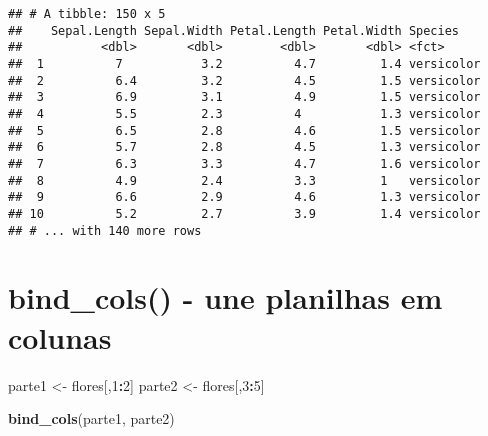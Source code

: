 \documentclass[]{book}
\newenvironment{Shaded}{\begin{snugshade}}{\end{snugshade}}
\newcommand{\DataTypeTok}[1]{\textcolor[rgb]{0.13,0.29,0.53}{#1}}
\newcommand{\DecValTok}[1]{\textcolor[rgb]{0.00,0.00,0.81}{#1}}
\newcommand{\KeywordTok}[1]{\textcolor[rgb]{0.13,0.29,0.53}{\textbf{#1}}}
\newcommand{\NormalTok}[1]{#1}
\newcommand{\OperatorTok}[1]{\textcolor[rgb]{0.81,0.36,0.00}{\textbf{#1}}}
\newcommand{\StringTok}[1]{\textcolor[rgb]{0.31,0.60,0.02}{#1}}
\begin{document}
\begin{Shaded}
\end{Shaded}

\begin{verbatim}
## # A tibble: 150 x 5
##    Sepal.Length Sepal.Width Petal.Length Petal.Width Species   
##           <dbl>       <dbl>        <dbl>       <dbl> <fct>     
##  1          7           3.2          4.7         1.4 versicolor
##  2          6.4         3.2          4.5         1.5 versicolor
##  3          6.9         3.1          4.9         1.5 versicolor
##  4          5.5         2.3          4           1.3 versicolor
##  5          6.5         2.8          4.6         1.5 versicolor
##  6          5.7         2.8          4.5         1.3 versicolor
##  7          6.3         3.3          4.7         1.6 versicolor
##  8          4.9         2.4          3.3         1   versicolor
##  9          6.6         2.9          4.6         1.3 versicolor
## 10          5.2         2.7          3.9         1.4 versicolor
## # ... with 140 more rows
\end{verbatim}

\hypertarget{bind_cols---une-planilhas-em-colunas}{%
\section{bind\_cols() - une planilhas em colunas}\label{bind_cols---une-planilhas-em-colunas}}

\begin{Shaded}
\begin{Highlighting}[]
\NormalTok{parte1 <-}\StringTok{ }\NormalTok{flores[,}\DecValTok{1}\OperatorTok{:}\DecValTok{2}\NormalTok{]}
\NormalTok{parte2 <-}\StringTok{ }\NormalTok{flores[,}\DecValTok{3}\OperatorTok{:}\DecValTok{5}\NormalTok{]}

\KeywordTok{bind_cols}\NormalTok{(parte1, parte2)}
\end{Highlighting}
\end{Shaded}
\end{document}
